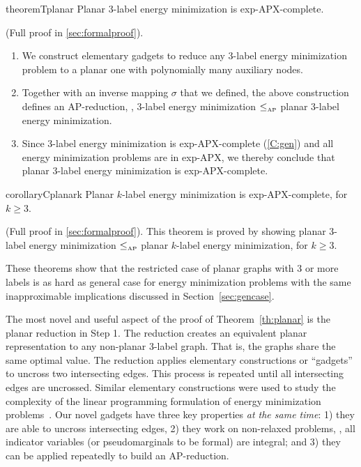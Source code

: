 \begin{restatable}{theorem}{Tplanar}\label{th:planar}
Planar 3-label energy minimization is exp-APX-complete.
\end{restatable}
\begin{proofsketch}
(Full proof in \cref{sec:formalproof}).
\begin{enumerate}
    \item We construct elementary gadgets to reduce any 3-label energy minimization problem to a planar one with polynomially many auxiliary nodes.
    \item Together with an inverse mapping $\sigma$ that we defined, the above construction defines an AP-reduction, \ie, 3-label energy minimization $\mathbin{{\leq}_{\text{\tiny AP}}}$ planar 3-label energy minimization.
    \item Since 3-label energy minimization is exp-APX-complete (\cref{C:gen}) and all energy minimization problems are in exp-APX, we thereby conclude that planar 3-label energy minimization is exp-APX-complete.
\end{enumerate}
\end{proofsketch}
\begin{restatable}{corollary}{Cplanark}\label{C:planark}
Planar $k$-label energy minimization is exp-APX-complete, for $k \geq 3$.
\end{restatable}
\begin{proofsketch}
(Full proof in \cref{sec:formalproof}).
This theorem is proved by showing planar 3-label energy minimization $ \mathbin{{\leq}_{\text{\tiny AP}}}$ planar $k$-label energy minimization, for $k \geq 3$. 
\end{proofsketch}
These theorems show that the restricted case of planar graphs with 3 or more labels is as hard as general case for energy minimization problems with the same inapproximable implications discussed in Section~\ref{sec:gencase}.

The most novel and useful aspect of the proof of Theorem~\ref{th:planar} is the planar reduction in Step 1. The reduction creates an equivalent planar representation to any non-planar 3-label graph.  That is, the graphs share the same optimal value.  The reduction applies elementary constructions or ``gadgets'' to uncross two intersecting edges. This process is repeated until all intersecting edges are uncrossed. Similar elementary constructions were used to study the complexity of the linear programming formulation of energy minimization problems~\cite{prusa2015universality,prusa2015hard}.
Our novel gadgets have three key properties {\em at the same time}: 1) they are able to uncross intersecting edges, 2) they work on non-relaxed problems, \ie, all indicator variables (or pseudomarginals to be formal) are integral; and 3) they can be applied repeatedly to build an AP-reduction.


